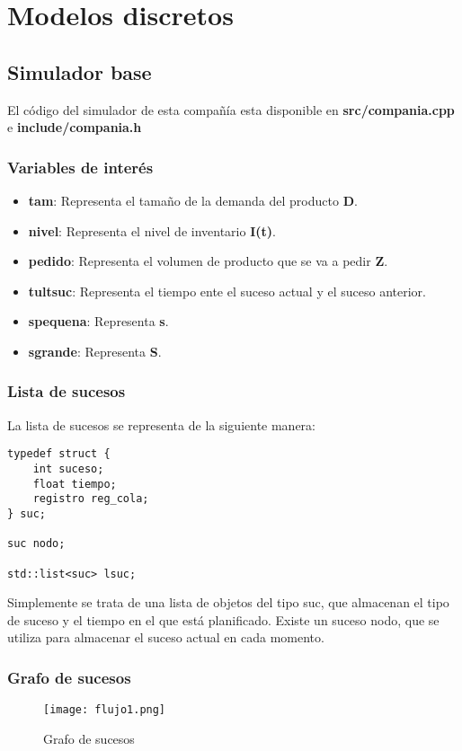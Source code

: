 \chapter{Modelos discretos}

\section{Simulador base}
El código del simulador de esta compañía esta disponible en \textbf{src/compania.cpp} e \textbf{include/compania.h}

\subsection{Variables de interés}
\begin{itemize}
	\item \textbf{tam}: Representa el tamaño de la demanda del producto \textbf{D}.
	\item \textbf{nivel}: Representa el nivel de inventario \textbf{I(t)}.
	\item \textbf{pedido}: Representa el volumen de producto  que se va a pedir \textbf{Z}.
	\item \textbf{tultsuc}: Representa el tiempo ente el suceso actual y el suceso anterior.
	\item \textbf{spequena}: Representa \textbf{s}.
	\item \textbf{sgrande}: Representa \textbf{S}.
\end{itemize}

\subsection{Lista de sucesos}
La lista de sucesos se representa de la siguiente manera:
\begin{verbatim}
typedef struct {
	int suceso;
	float tiempo;
	registro reg_cola;
} suc;

suc nodo;

std::list<suc> lsuc;
\end{verbatim}
Simplemente se trata de una lista de objetos del tipo suc, que almacenan el tipo de suceso y el tiempo en el que está planificado.
Existe un suceso nodo, que se utiliza para almacenar el suceso actual en cada momento.

\newpage

\subsection{Grafo de sucesos}
\begin{figure}[H]
	\centering
	\texttt{[image: flujo1.png]}
	\caption{Grafo de sucesos}
\end{figure}

